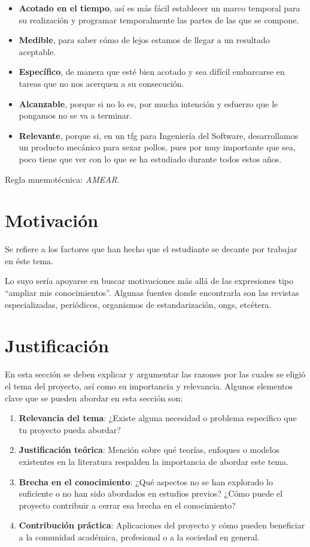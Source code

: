 \begin{itemize}
    \item \textbf{Acotado en el tiempo}, así es más fácil establecer un marco temporal para su realización y programar temporalmente las partes de las que se compone.
    \item \textbf{Medible}, para saber cómo de lejos estamos de llegar a un resultado aceptable.
    \item \textbf{Específico}, de manera que esté bien acotado y sea difícil embarcarse en tareas que no nos acerquen a su consecución.
    \item \textbf{Alcanzable}, porque si no lo es, por mucha intención y esfuerzo que le pongamos no se va a terminar.
    \item \textbf{Relevante}, porque si, en un \gls{tfg} para Ingeniería del Software, desarrollamos un producto mecánico para sexar pollos, pues por muy importante que sea, poco tiene que ver con lo que se ha estudiado durante todos estos años.
\end{itemize}

Regla mnemotécnica: \textit{AMEAR}.

\section{Motivación}

Se refiere a los factores que han hecho que el estudiante se decante por trabajar en éste tema.

Lo suyo sería apoyarse en buscar motivaciones más allá de las expresiones tipo \enquote{ampliar mis conocimientos}. Algunas fuentes donde encontrarla son las revistas especializadas, periódicos, organismos de estandarización, \glspl{ong}, etcétera.

\section{Justificación}

En esta sección se deben explicar y argumentar las razones por las cuales se eligió el tema del proyecto, así como su importancia y relevancia. Algunos elementos clave que se pueden abordar en esta sección son:

\begin{enumerate}
    \item \textbf{Relevancia del tema}: ¿Existe alguna necesidad o problema específico que tu proyecto pueda abordar?
    \item \textbf{Justificación teórica}: Mención sobre qué teorías, enfoques o modelos existentes en la literatura respalden la importancia de abordar este tema.
    \item \textbf{Brecha en el conocimiento}: ¿Qué aspectos no se han explorado lo suficiente o no han sido abordados en estudios previos? ¿Cómo puede el proyecto contribuir a cerrar esa brecha en el conocimiento?
    \item \textbf{Contribución práctica}: Aplicaciones del proyecto y cómo pueden beneficiar a la comunidad académica, profesional o a la sociedad en general.
\end{enumerate}

